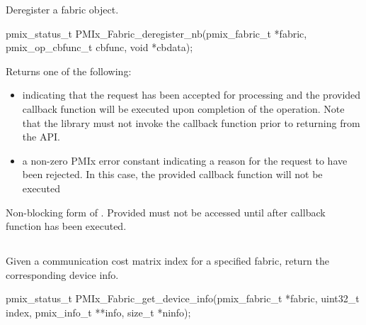 \summary

Deregister a fabric object.

\format

\cspecificstart
\begin{codepar}
pmix_status_t PMIx_Fabric_deregister_nb(pmix_fabric_t *fabric,
                                        pmix_op_cbfunc_t cbfunc,
                                        void *cbdata);
\end{codepar}
\cspecificend

\begin{arglist}
\end{arglist}

Returns one of the following:

\begin{itemize}
\item {} indicating that the request has been accepted for processing and the provided callback function will be executed upon completion of the operation. Note that the library must not invoke the callback function prior to returning from the \ac{API}.
\item a non-zero \ac{PMIx} error constant indicating a reason for the request to have been rejected. In this case, the provided callback function will not be executed
\end{itemize}

\descr

Non-blocking form of . Provided  must not be accessed until after callback function has been executed.


\subsection{}

\summary

Given a communication cost matrix index for a specified fabric, return the corresponding device info.

\format

\cspecificstart
\begin{codepar}
pmix_status_t
PMIx_Fabric_get_device_info(pmix_fabric_t *fabric, uint32_t index,
                            pmix_info_t **info, size_t *ninfo);
\end{codepar}
\cspecificend

